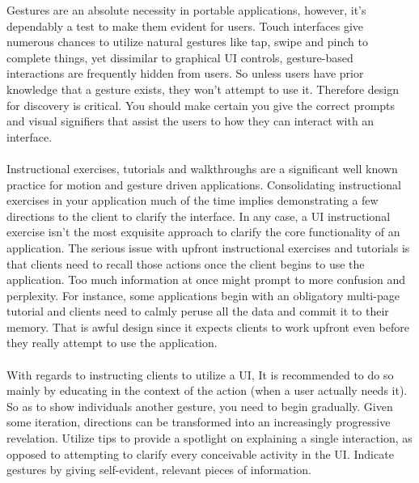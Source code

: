 \documentclass{article}
\begin{document}
Gestures are an absolute necessity in portable applications, however, it's dependably a test to make them evident for users. Touch interfaces give numerous chances to utilize natural gestures like tap, swipe and pinch to complete things, yet dissimilar to graphical UI controls, gesture-based interactions are frequently hidden from users. So unless users have prior knowledge that a gesture exists, they won’t attempt to use it. Therefore design for discovery is critical. \cite{brereton2008new} You should make certain you give the correct prompts and visual signifiers that assist the users to how they can interact with an interface.
\\\\
Instructional exercises, tutorials and walkthroughs are a significant well known practice for motion and gesture driven applications. Consolidating instructional exercises in your application much of the time implies demonstrating a few directions to the client to clarify the interface. In any case, a UI instructional exercise isn't the most exquisite approach to clarify the core functionality of an application. The serious issue with upfront instructional exercises and tutorials is that clients need to recall those actions once the client begins to use the application. \cite{brereton2008new} Too much information at once might prompt to more confusion and perplexity. For instance, some applications begin with an obligatory multi-page tutorial and clients need to calmly peruse all the data and commit it to their memory. That is awful design since it expects clients to work upfront even before they really attempt to use the application.
\\\\
With regards to instructing clients to utilize a UI, It is recommended to do so mainly by educating in the context of the action (when a user actually needs it)\cite{bhuiyan2011gesture}. So as to show individuals another gesture, you need to begin gradually. Given some iteration, directions can be transformed into an increasingly progressive revelation. Utilize tips to provide a spotlight on explaining a single interaction, as opposed to attempting to clarify every conceivable activity in the UI. Indicate gestures by giving self-evident, relevant pieces of information.
\\\\
\end{document}
